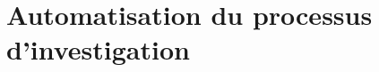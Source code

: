 \chapter{Automatisation du processus d'investigation}
\label{Automatisation du processus d'investigation}
\thispagestyle{fancy}
%
%
